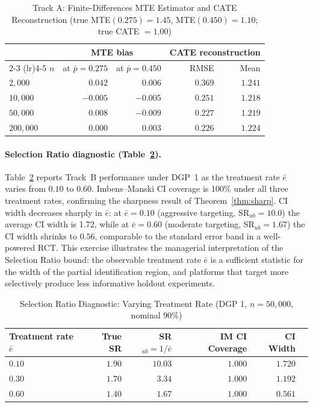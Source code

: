 \documentclass[11pt]{article}
\begin{document}
\begin{table}[htbp]
  \centering
  \small
  \caption{Track A: Finite-Differences MTE Estimator and CATE Reconstruction
  (true MTE$(0.275)=1.45$, MTE$(0.450)=1.10$; true CATE $= 1.00$)}
  \label{tab:tracka}
  \begin{tabular}{lrrrr}
    \toprule
    & \multicolumn{2}{c}{MTE bias} & \multicolumn{2}{c}{CATE reconstruction} \\
    \cmidrule(lr){2-3} \cmidrule(lr){4-5}
    $n$ & at $\bar{p}=0.275$ & at $\bar{p}=0.450$ & RMSE & Mean \\
    \midrule
    $2{,}000$   & $0.042$ & $0.006$ & $0.369$ & $1.241$ \\
    $10{,}000$  & $-0.005$ & $-0.005$ & $0.251$ & $1.218$ \\
    $50{,}000$  & $0.008$ & $-0.009$ & $0.227$ & $1.219$ \\
    $200{,}000$ & $0.000$ & $0.003$ & $0.226$ & $1.224$ \\
    \bottomrule
  \end{tabular}
\end{table}

\paragraph{Selection Ratio diagnostic (Table~\ref{tab:sr}).}

Table~\ref{tab:sr} reports Track~B performance under DGP~1 as the treatment
rate $\bar{e}$ varies from $0.10$ to $0.60$.  Imbens--Manski CI coverage is
100\% under all three treatment rates, confirming the sharpness result of
Theorem~\ref{thm:sharp}.  CI width decreases sharply in $\bar{e}$: at $\bar{e}
= 0.10$ (aggressive targeting, SR$_{ub} = 10.0$) the average CI width is 1.72,
while at $\bar{e} = 0.60$ (moderate targeting, SR$_{ub} = 1.67$) the CI width
shrinks to $0.56$, comparable to the standard error band in a well-powered RCT.
This exercise illustrates the managerial interpretation of the Selection Ratio
bound: the observable treatment rate $\bar{e}$ is a sufficient statistic for
the width of the partial identification region, and platforms that target more
selectively produce less informative holdout experiments.

\begin{table}[htbp]
  \centering
  \small
  \caption{Selection Ratio Diagnostic: Varying Treatment Rate (DGP 1, $n = 50{,}000$, nominal 90\%)}
  \label{tab:sr}
  \begin{tabular}{lrrrrr}
    \toprule
    Treatment rate $\bar{e}$ & True SR & SR$_{ub} = 1/\bar{e}$ & IM CI Coverage & CI Width \\
    \midrule
    $0.10$ & $1.90$ & $10.03$ & $1.000$ & $1.720$ \\
    $0.30$ & $1.70$ & $3.34$ & $1.000$ & $1.192$ \\
    $0.60$ & $1.40$ & $1.67$ & $1.000$ & $0.561$ \\
    \bottomrule
  \end{tabular}
\end{table}
\end{document}
